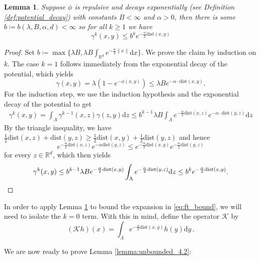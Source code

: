 \documentclass[10pt]{amsart}
\newtheorem{lemma}[theorem]{Lemma}
\theoremstyle{definition}
\theoremstyle{remark}
\newcommand{\dist}{\mathrm{dist}}
\newcommand{\R}{\mathbb{R}}
\newcommand{\region}{\Lambda}
\newcommand{\potential}{\phi}
\newcommand{\activity}{\lambda}
\newcommand{\diff}{\mathrm{d}}
\newcommand{\norm}[1]{\left\lVert#1\right\rVert}
\begin{document}
	
	\begin{lemma} \label{claim:gamma}
		Suppose $\potential$ is repulsive and decays exponentially (see Definition \ref{def:potential_decay}) with constants $B < \infty$ and $\alpha > 0$, then there is some $b \coloneqq b(\activity, B, \alpha, d) < \infty$ so for all $k \geq 1$ we have
		\[
		\gamma^k(x, y) \le b^k e^{- \frac{\alpha}{2}  \dist(x, y)}
		\]
	\end{lemma}
	\begin{proof}
		Set 
		$
		b \coloneqq \max\{\activity  B, \activity B \int_{\R^d} e^{- \frac{\alpha}{2} \norm{x}} \diff x\} .
		$
		We prove the claim by induction on $k$.
		The case $k=1$ follows immediately from the exponential decay of the potential, which yields
		\[
		\gamma(x, y) 
		= \activity  (1 - e^{- \potential(x, y)}) \le \activity B e^{ - \alpha\cdot\dist(x, y)}.
		\]
		For the induction step, we use the induction hypothesis and the exponential decay of the potential to get
		\begin{align*}
			\gamma^k(x, y) 
			= \int_{\region} \gamma^{k-1}(x, z)  \gamma(z, y) \diff z 
			\le b^{k-1}  \activity B \int_{\region} e^{-\frac{\alpha}{2}  \dist(x, z)}  e^{- \alpha\cdot\dist(y, z)} \diff z
		\end{align*}
		By the triangle inequality, we have  $\frac{1}{2}  \dist(x, z) + \dist(y, z) \ge \frac{1}{2} \dist(x, y) + \frac{1}{2}  \dist(y, z)$ and hence
		\[
		e^{-\frac{\alpha}{2}  \dist(x, z)}  e^{- \alpha  \dist(y, z)} \le e^{- \frac{\alpha}{2}  \dist(x, y)} e^{- \frac{\alpha}{2}  \dist(y, z)} 
		\]
		for every $z \in \R^d$, which then yields
		\[
		\gamma^k(x, y) 
		\le b^{k-1} \activity B e^{- \frac{\alpha}{2}  \dist(x, y)} \int_{\region} e^{- \frac{\alpha}{2}  \dist(y, z)}  \diff z
		\le b^k e^{- \frac{\alpha}{2} \dist(x, y)}. \qedhere
		\]
	\end{proof}
	
	In order to apply Lemma \ref{claim:gamma} to bound the expansion in \eqref{eq:ft_bound}, we will need to isolate the $k = 0$ term.  With this in mind, define the operator $\mathcal{K}$ by $$(\mathcal{K} h)(x) = \int_{\Lambda} e^{-\frac{\alpha}{2} \dist(x,y)}h(y) \diff y\,.$$
	
	
	
	
	We are now ready to prove Lemma \ref{lemma:unbounded_4.2}:
	
\end{document}
